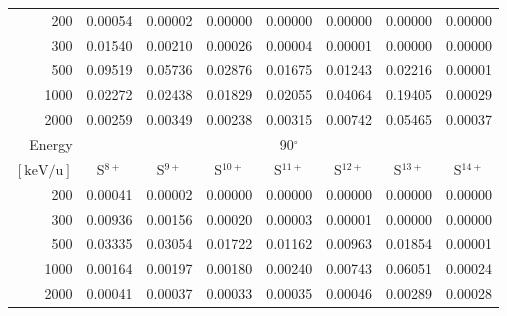 \begin{table}[ht]
\begin{tabular}{r|c|c|c|c|c|c|c}
    200   & 0.00054 & 0.00002 & 0.00000 & 0.00000 & 0.00000 & 0.00000 & 0.00000 \\
    300   & 0.01540 & 0.00210 & 0.00026 & 0.00004 & 0.00001 & 0.00000 & 0.00000 \\
    500   & 0.09519 & 0.05736 & 0.02876 & 0.01675 & 0.01243 & 0.02216 & 0.00001 \\
    1000  & 0.02272 & 0.02438 & 0.01829 & 0.02055 & 0.04064 & 0.19405 & 0.00029 \\
    2000  & 0.00259 & 0.00349 & 0.00238 & 0.00315 & 0.00742 & 0.05465 & 0.00037 \\ \cline{1-8}
    Energy & \multicolumn{7}{c}{90$^\circ$} \\ \cline{2-8}
    $\mathrm{[keV/u]}$ & S$^{8+}$ & S$^{9+}$ & S$^{10+}$ & S$^{11+}$ & S$^{12+}$ & S$^{13+}$ & S$^{14+}$ \\ \cline{1-8}
    200   & 0.00041 & 0.00002 & 0.00000 & 0.00000 & 0.00000 & 0.00000 & 0.00000 \\
    300   & 0.00936 & 0.00156 & 0.00020 & 0.00003 & 0.00001 & 0.00000 & 0.00000 \\
    500   & 0.03335 & 0.03054 & 0.01722 & 0.01162 & 0.00963 & 0.01854 & 0.00001 \\
    1000  & 0.00164 & 0.00197 & 0.00180 & 0.00240 & 0.00743 & 0.06051 & 0.00024 \\
    2000  & 0.00041 & 0.00037 & 0.00033 & 0.00035 & 0.00046 & 0.00289 & 0.00028 \\ \cline{1-8}
    \end{tabular}
    \label{tab:XRayEffODE2}
\end{table}
